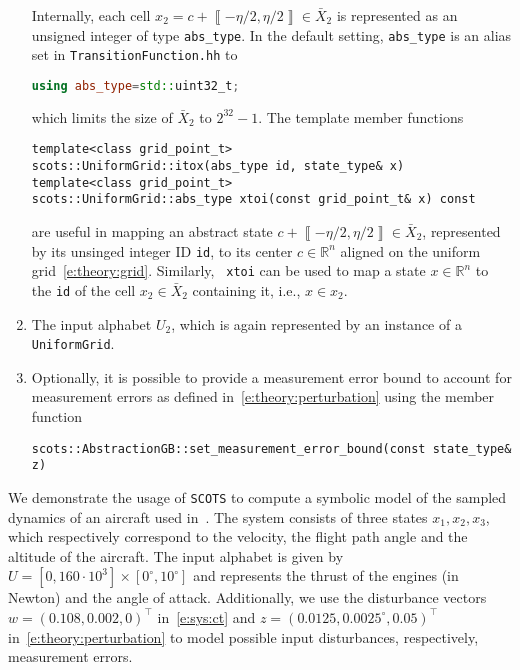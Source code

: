 \documentclass[a4paper]{amsart}
\newcommand{\segcc}[1]{\ensuremath{{\left\llbracket#1\right\rrbracket}}}
\newcommand{\intcc}[1]{\ensuremath{{\left[#1\right]}}}
\newcommand{\R}{\mathbb{R}}
\begin{document}
\begin{enumerate}
	Internally, each cell $x_2=c+\segcc{-\eta/2,\eta/2}\in\bar X_2$ is represented
  as an unsigned integer of type {\tt abs\_type}. In the default setting, {\tt abs\_type} is an alias set in {\tt TransitionFunction.hh} to 
\begin{lstlisting}[basicstyle=\small\ttfamily, language=C++]
using abs_type=std::uint32_t;
\end{lstlisting}
  which limits the size of $\bar X_2$ to $2^{32}-1$. The template member functions 
\begin{lstlisting}[basicstyle=\small\ttfamily]
template<class grid_point_t>
scots::UniformGrid::itox(abs_type id, state_type& x)
template<class grid_point_t>
scots::UniformGrid::abs_type xtoi(const grid_point_t& x) const 
\end{lstlisting}
  are useful in mapping an abstract state $c+\segcc{-\eta/2,\eta/2}\in
  \bar X_2$, represented by its unsinged integer ID {\tt id}, to its center
  $c\in \R^n$ aligned on the uniform grid~\eqref{e:theory:grid}. Similarly, {\tt
  xtoi} can be used to map a state $x\in \R^n$ to the {\tt id} of the cell
  $x_2\in\bar X_2$ containing it, i.e., $x\in x_2$.

  \item The input alphabet $U_2$, which is again represented by an instance
  of a {\tt UniformGrid}.

  \item Optionally, it is possible to provide a measurement error bound to
  account for measurement errors as defined in~\eqref{e:theory:perturbation} using the
  member function
\begin{lstlisting}[basicstyle=\small\ttfamily]
scots::AbstractionGB::set_measurement_error_bound(const state_type& z)
\end{lstlisting}
\end{enumerate}

We demonstrate the usage of {\tt SCOTS} to compute a symbolic
model of the sampled dynamics of an aircraft used
in~\cite[Sec.~IX.B]{ReissigWeberRungger15}. The system consists of three states $x_1,x_2,x_3$, which respectively correspond to the velocity, the flight path angle and the altitude of the
aircraft. The input alphabet is given by $U =
\intcc{0,160\cdot 10^3} \times \intcc{0^\circ,10^\circ}$ 
and represents the thrust of the engines (in Newton) and the angle of attack.
Additionally, we use the disturbance vectors $w=(0.108,0.002,0)^\top$
in~\eqref{e:sys:ct} and  $z=(0.0125,0.0025^\circ,0.05)^\top$
in~\eqref{e:theory:perturbation} to model possible input
disturbances, respectively, measurement errors.
\end{document}
